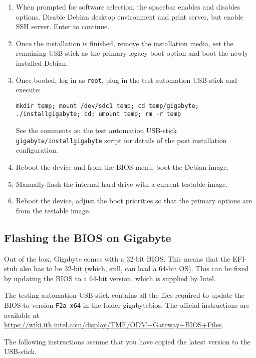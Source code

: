 \documentclass[a4paper,11pt]{article}
\newcommand{\cmd}[1]{\texttt{#1}}
\begin{document}
\begin{enumerate}
\item When prompted for software selection, the spacebar enables and disables options. Disable Debian desktop environment and print server, but enable SSH server. Enter to continue.

\item Once the installation is finished, remove the installation media, set the remaining USB-stick as the primary legacy boot option and boot the newly installed Debian.

\item Once booted, log in as \cmd{root}, plug in the test automation USB-stick and execute:

\begin{lstlisting}
mkdir temp; mount /dev/sdc1 temp; cd temp/gigabyte; ./installgigabyte; cd; umount temp; rm -r temp
\end{lstlisting}

See the comments on the test automation USB-stick \cmd{gigabyte/installgigabyte} script for details of the post installation configuration.

\item Reboot the device and from the BIOS menu, boot the Debian image.

\item Manually flash the internal hard drive with a current testable image.

\item Reboot the device, adjust the boot priorities so that the primary options are from the testable image.
\end{enumerate}

\subsection{Flashing the BIOS on Gigabyte}
Out of the box, Gigabyte comes with a 32-bit BIOS. This means that the EFI-stub also has to be 32-bit (which, still, can load a 64-bit OS). This can be fixed by updating the BIOS to a 64-bit version, which is supplied by Intel.

The testing automation USB-stick contains all the files required to update the BIOS to version \cmd{F2a x64} in the folder gigabytebios. The official instructions are available at \url{https://wiki.ith.intel.com/display/TME/ODM+Gateway+BIOS+Files}.

The following instructions assume that you have copied the latest version to the USB-stick.
\end{document}
